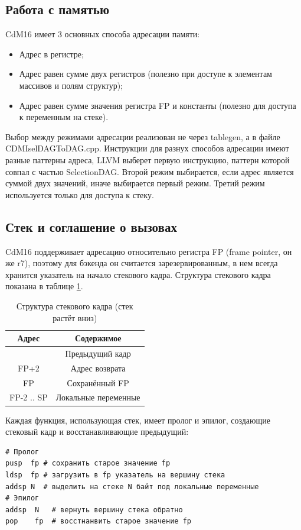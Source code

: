 \documentclass[a4paper,14pt]{extarticle}
\begin{document}
\subsection{Работа с памятью}
CdM16 имеет 3 основных способа адресации памяти:
\begin{itemize}
	\item Адрес в регистре;
	\item Адрес равен сумме двух регистров (полезно при доступе к элементам массивов и полям структур);
	\item Адрес равен сумме значения регистра FP и константы (полезно для доступа к переменным на стеке).
\end{itemize}

Выбор между режимами адресации реализован не через tablegen, а в файле CDMIselDAGToDAG.cpp. Инструкции для разнух способов адресации имеют разные паттерны адреса, LLVM выберет первую инструкцию, паттерн которой совпал с частью SelectionDAG. Второй режим выбирается, если адрес является суммой двух значений, иначе выбирается первый режим. Третий режим используется только для доступа к стеку.

\subsection{Стек и соглашение о вызовах}
CdM16 поддерживает адресацию относительно регистра FP (frame pointer, он же r7), поэтому для бэкенда он считается зарезервированным, в нем всегда хранится указатель на начало стекового кадра. Структура стекового кадра показана в таблице \ref{stack-table}.
\begin{table}[!h]
	\caption{Структура стекового кадра (стек растёт вниз)}
	\label{stack-table}
	\begin{center}
		\begin{tabular}{ |c|c| }
			\hline
			Адрес & Содержимое \\
			\hline
			 & Предыдущий кадр \\
			 FP+2 & Адрес возврата \\
			 FP & Сохранённый FP \\
			 FP-2 .. SP & Локальные переменные \\
			 \hline
		\end{tabular}
	\end{center}
\end{table}

Каждая функция, использующая стек, имеет пролог и эпилог, создающие стековый кадр и восстанавливающие предыдущий:
\begin{verbatim}
# Пролог
pusр  fp # сохранить старое значение fp
ldsp  fp # загрузить в fp указатель на вершину стека
addsp N  # выделить на стеке N байт под локальные переменные
# Эпилог
addsp  N   # вернуть вершину стека обратно
pop    fp  # восстнанвить старое значение fp
\end{verbatim}
\end{document}
